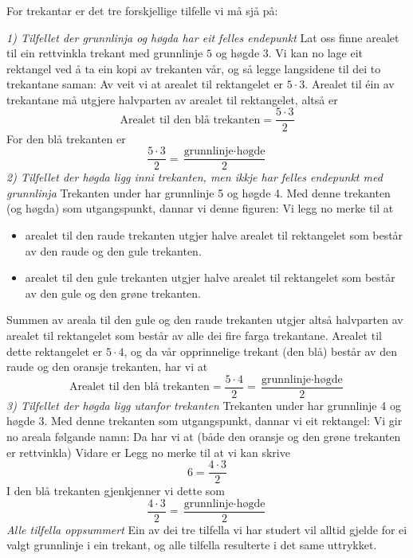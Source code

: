 \subsubsection{\artri \label{artri}}
For trekantar er det tre forskjellige tilfelle vi må sjå på: \vsk

\textit{1) Tilfellet der grunnlinja og høgda har eit felles endepunkt} \os
Lat oss finne arealet til ein rettvinkla trekant med grunnlinje $ 5 $ og høgde $ 3 $.
Vi kan no lage eit rektangel ved å ta ein kopi av trekanten vår, og så legge langsidene til dei to trekantane saman:
Av  veit vi at arealet til rektangelet er $ {5\cdot 3} $. Arealet til éin av trekantane må utgjere halvparten av arealet til rektangelet, altså er
\[ \text{Arealet til den blå trekanten} = \frac{5\cdot 3}{2} \]
For den blå trekanten er 
\[\frac{5\cdot3}{2}= \frac{\text{grunnlinje}\cdot \text{høgde}}{2} \]
\newpage
\textit{2) Tilfellet der høgda ligg inni trekanten, men ikkje har felles endepunkt med grunnlinja} \os
Trekanten under har grunnlinje 5 og høgde 4.
Med denne trekanten (og høgda) som utgangspunkt, dannar vi denne figuren:
Vi legg no merke til at
\begin{itemize}
	\item arealet til den raude trekanten utgjer halve arealet til rektangelet som består av den raude og den gule trekanten.
	\item arealet til den gule trekanten utgjer halve arealet til rektangelet som består av den gule og den grøne trekanten.
\end{itemize}
Summen av areala til den gule og den raude trekanten utgjer altså halvparten av arealet til rektangelet som består av alle dei fire farga trekantane. Arealet til dette rektangelet er $ 5\cdot4 $, og da vår opprinnelige trekant (den blå) består av den raude og den oransje trekanten, har vi at
\[ \text{Arealet til den blå trekanten}=\frac{5\cdot4}{2}=\frac{\text{grunnlinje}\cdot\text{høgde}}{2} \] 
\newpage
\textit{3) Tilfellet der høgda ligg utanfor trekanten} \os
Trekanten under har grunnlinje 4 og høgde 3. 
Med denne trekanten som utgangspunkt, dannar vi eit rektangel:
Vi gir no areala følgande namn:
Da har vi at (både den oransje og den grøne trekanten er rettvinkla)
Vidare er
Legg no merke til at vi kan skrive
\[ 6=\frac{4\cdot3}{2} \]
I den blå trekanten gjenkjenner vi dette som 
\[ \frac{4\cdot3}{2}=\frac{\text{grunnlinje}\cdot\text{høgde}}{2} \]
\newpage
\textit{Alle tilfella oppsummert}\os
Ein av dei tre tilfella vi har studert vil alltid  gjelde for ei valgt grunnlinje i ein trekant, og alle tilfella resulterte i det same uttrykket.\regv

